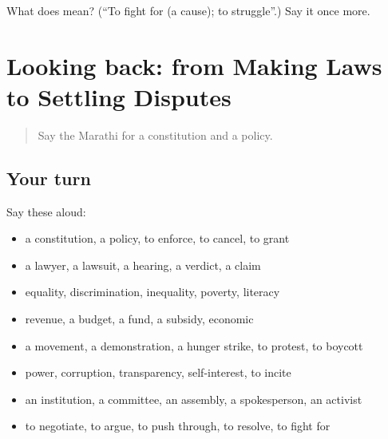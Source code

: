 \begin{tcolorbox}[breakable,colback=teal!4,colframe=teal!35!black,title={Before you move on}]
What does   mean? (\textquotedblleft{}To fight for (a cause); to struggle\textquotedblright{}.) Say it once more.
\end{tcolorbox}
\section[(dialogue)]{Looking back: from Making Laws to Settling Disputes}

\label{lesson:MR-R365-review-358-365}



\begin{quote}
Say the Marathi for a constitution and a policy.
\end{quote}

\subsection*{Your turn}
Say these aloud:

\begin{itemize}
\raggedright
  \item a constitution, a policy, to enforce, to cancel, to grant
  \item a lawyer, a lawsuit, a hearing, a verdict, a claim
  \item equality, discrimination, inequality, poverty, literacy
  \item revenue, a budget, a fund, a subsidy, economic
  \item a movement, a demonstration, a hunger strike, to protest, to boycott
  \item power, corruption, transparency, self-interest, to incite
  \item an institution, a committee, an assembly, a spokesperson, an activist
  \item to negotiate, to argue, to push through, to resolve, to fight for
\end{itemize}

